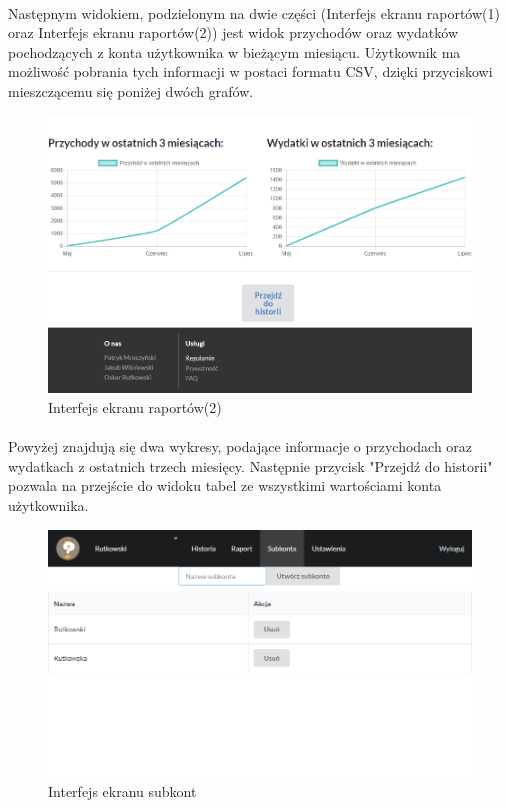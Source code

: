 \documentclass{article}
\begin{document}
\paragraph*{} Następnym widokiem, podzielonym na dwie części (Interfejs ekranu raportów(1) oraz Interfejs ekranu raportów(2)) jest widok przychodów oraz wydatków pochodzących z konta użytkownika w bieżącym miesiącu. Użytkownik ma możliwość pobrania tych informacji w postaci formatu CSV, dzięki przyciskowi mieszczącemu się poniżej dwóch grafów.
\begin{figure}[H]
	\hspace*{0cm}
	\includegraphics[scale=0.5]{assets/view3(2).png}
	\caption[]{Interfejs ekranu raportów(2)}
	\label{fig:raport2}
\end{figure}
\paragraph*{} Powyżej znajdują się dwa wykresy, podające informacje o przychodach oraz wydatkach z ostatnich trzech miesięcy. Następnie przycisk "Przejdź do historii" pozwala na przejście do widoku tabel ze wszystkimi wartościami konta użytkownika.
\begin{figure}[H]
	\hspace*{0.5cm}
	\includegraphics[scale=0.5]{assets/view4.png}
	\caption[]{Interfejs ekranu subkont}
	\label{fig:subkonta}
\end{figure}
\end{document}
